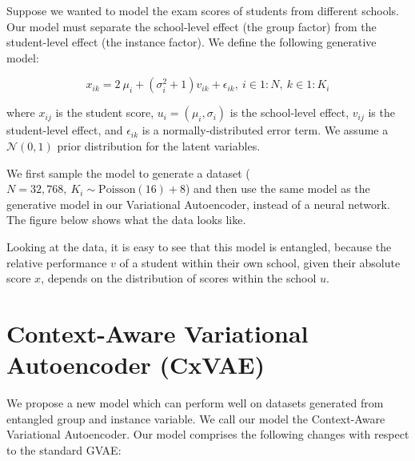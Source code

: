 \documentclass[nohyperref]{article}
\theoremstyle{plain}
\theoremstyle{definition}
\theoremstyle{remark}
\begin{document}
Suppose we wanted to model the exam scores of students from different schools. Our model must separate the school-level effect (the group factor) from the student-level effect (the instance factor). We define the following generative model:

$$x_{ik} = 2 ~ \mu_i +  (\sigma^2_i + 1) v_{ik} + \epsilon_{ik}, ~ i \in 1:N, ~ k \in 1:K_i$$

where $x_{ij}$ is the student score, $u_i = (\mu_i, \sigma_i)$ is the school-level effect, $v_{ij}$ is the student-level effect, and $\epsilon_{ik}$ is a normally-distributed error term. We assume a $\mathcal{N} (0, 1)$ prior distribution for the latent variables.

We first sample the model to generate a dataset ($N = 32,768, ~ K_i \sim \mathrm{Poisson} (16) + 8$) and then use the same model as the generative model in our Variational Autoencoder, instead of a neural network. The figure below shows what the data looks like.

Looking at the data, it is easy to see that this model is entangled, because the relative performance $v$ of a student within their own school, given their absolute score $x$, depends on the distribution of scores within the school $u$.

\section{Context-Aware Variational Autoencoder (CxVAE)}

We propose a new model which can perform well on datasets generated from entangled group and instance variable. We call our model the Context-Aware Variational Autoencoder. Our model comprises the following changes with respect to the standard GVAE:
\end{document}
